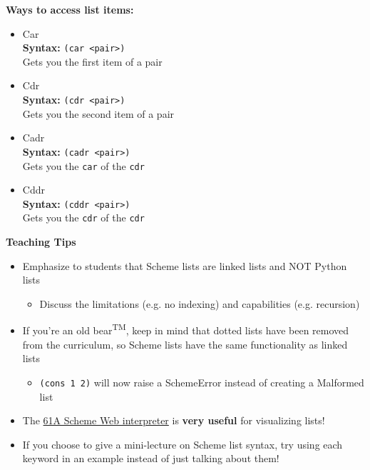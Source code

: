 \textbf{Ways to access list items:}
\begin{itemize}
\item Car \\
\textbf{Syntax:} \lstinline{(car <pair>)} \\
Gets you the first item of a pair
\item Cdr \\
\textbf{Syntax:} \lstinline{(cdr <pair>)} \\
Gets you the second item of a pair
\end{itemize}
\begin{itemize}
\item Cadr \\
\textbf{Syntax:} \lstinline{(cadr <pair>)} \\
Gets you the \lstinline{car} of the \lstinline{cdr}
\end{itemize}
\begin{itemize}
\item Cddr \\
\textbf{Syntax:} \lstinline{(cddr <pair>)} \\
Gets you the \lstinline{cdr} of the \lstinline{cdr}
\end{itemize}

\begin{guide}
\begin{blocksection}
\textbf{Teaching Tips}
\begin{itemize}
  \item Emphasize to students that Scheme lists are linked lists and NOT Python lists
  \begin{itemize}
    \item Discuss the limitations (e.g. no indexing) and capabilities (e.g. recursion)
  \end{itemize}
  \item If you're an old bear\textsuperscript{TM}, keep in mind that dotted lists have been removed from the curriculum, so Scheme lists have the same functionality as linked lists
  \begin{itemize}
    \item \lstinline{(cons 1 2)} will now raise a SchemeError instead of creating a Malformed list
  \end{itemize}
  \item The \href{https://code.cs61a.org/}{61A Scheme Web interpreter} is \textbf{very useful} for visualizing lists!
  \item If you choose to give a mini-lecture on Scheme list syntax, try using each keyword in an example instead of just talking about them!
\end{itemize}
\end{blocksection}
\end{guide}
